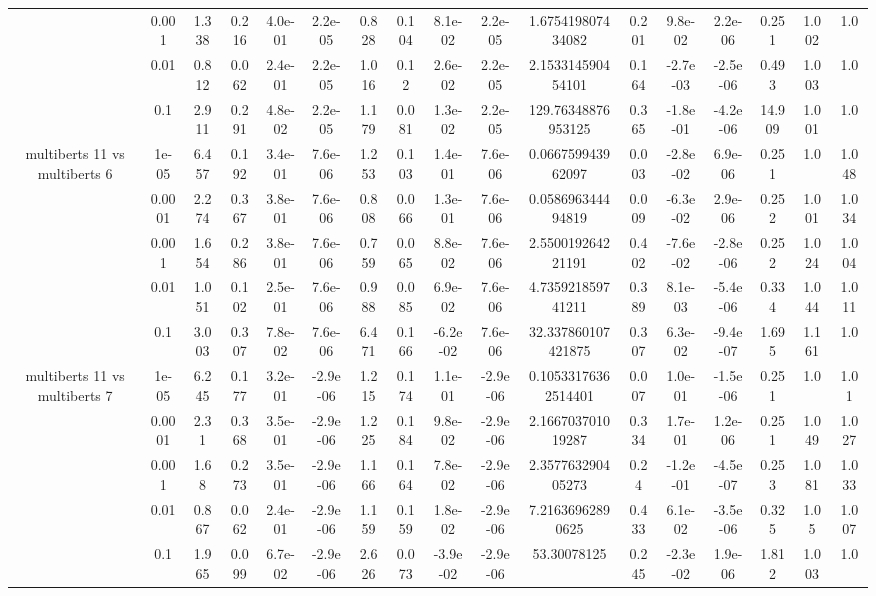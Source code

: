 \begin{tabular}{|c|c|c|c|c|c|c|c|c|c|c|c|c|c|c|c|c|}
 & 0.001 & 1.338 & 0.216 & 4.0e-01 & 2.2e-05 & 0.828 & 0.104 & 8.1e-02 & 2.2e-05 & 1.675419807434082 & 0.201 & 9.8e-02 & 2.2e-06 & 0.251 & 1.002 & 1.0 \\
 & 0.01 & 0.812 & 0.062 & 2.4e-01 & 2.2e-05 & 1.016 & 0.12 & 2.6e-02 & 2.2e-05 & 2.153314590454101 & 0.164 & -2.7e-03 & -2.5e-06 & 0.493 & 1.003 & 1.0 \\
 & 0.1 & 2.911 & 0.291 & 4.8e-02 & 2.2e-05 & 1.179 & 0.081 & 1.3e-02 & 2.2e-05 & 129.76348876953125 & 0.365 & -1.8e-01 & -4.2e-06 & 14.909 & 1.001 & 1.0 \\
\hline
\multirow{5}{*}{multiberts 11 vs multiberts 6} & 1e-05 & 6.457 & 0.192 & 3.4e-01 & 7.6e-06 & 1.253 & 0.103 & 1.4e-01 & 7.6e-06 & 0.066759943962097 & 0.003 & -2.8e-02 & 6.9e-06 & 0.251 & 1.0 & 1.048 \\
 & 0.0001 & 2.274 & 0.367 & 3.8e-01 & 7.6e-06 & 0.808 & 0.066 & 1.3e-01 & 7.6e-06 & 0.058696344494819 & 0.009 & -6.3e-02 & 2.9e-06 & 0.252 & 1.001 & 1.034 \\
 & 0.001 & 1.654 & 0.286 & 3.8e-01 & 7.6e-06 & 0.759 & 0.065 & 8.8e-02 & 7.6e-06 & 2.550019264221191 & 0.402 & -7.6e-02 & -2.8e-06 & 0.252 & 1.024 & 1.004 \\
 & 0.01 & 1.051 & 0.102 & 2.5e-01 & 7.6e-06 & 0.988 & 0.085 & 6.9e-02 & 7.6e-06 & 4.735921859741211 & 0.389 & 8.1e-03 & -5.4e-06 & 0.334 & 1.044 & 1.011 \\
 & 0.1 & 3.003 & 0.307 & 7.8e-02 & 7.6e-06 & 6.471 & 0.166 & -6.2e-02 & 7.6e-06 & 32.337860107421875 & 0.307 & 6.3e-02 & -9.4e-07 & 1.695 & 1.161 & 1.0 \\
\hline
\multirow{5}{*}{multiberts 11 vs multiberts 7} & 1e-05 & 6.245 & 0.177 & 3.2e-01 & -2.9e-06 & 1.215 & 0.174 & 1.1e-01 & -2.9e-06 & 0.10533176362514401 & 0.007 & 1.0e-01 & -1.5e-06 & 0.251 & 1.0 & 1.01 \\
 & 0.0001 & 2.31 & 0.368 & 3.5e-01 & -2.9e-06 & 1.225 & 0.184 & 9.8e-02 & -2.9e-06 & 2.166703701019287 & 0.334 & 1.7e-01 & 1.2e-06 & 0.251 & 1.049 & 1.027 \\
 & 0.001 & 1.68 & 0.273 & 3.5e-01 & -2.9e-06 & 1.166 & 0.164 & 7.8e-02 & -2.9e-06 & 2.357763290405273 & 0.24 & -1.2e-01 & -4.5e-07 & 0.253 & 1.081 & 1.033 \\
 & 0.01 & 0.867 & 0.062 & 2.4e-01 & -2.9e-06 & 1.159 & 0.159 & 1.8e-02 & -2.9e-06 & 7.21636962890625 & 0.433 & 6.1e-02 & -3.5e-06 & 0.325 & 1.05 & 1.007 \\
 & 0.1 & 1.965 & 0.099 & 6.7e-02 & -2.9e-06 & 2.626 & 0.073 & -3.9e-02 & -2.9e-06 & 53.30078125 & 0.245 & -2.3e-02 & 1.9e-06 & 1.812 & 1.003 & 1.0 \\

\end{tabular}
